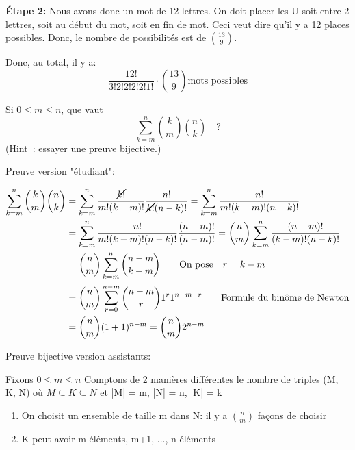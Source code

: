 \textbf{Étape 2: } Nous avons donc un mot de 12 lettres. On doit placer les U soit entre 2 lettres, soit au début du mot, soit en fin de mot. Ceci veut dire qu'il y a 12 places possibles. Donc, le nombre de possibilités est de $ {13 \choose 9} $.

Donc, au total, il y a: \[ \frac{12!}{3! 2! 2! 2! 2! 1!} \cdot {13 \choose 9} \text{mots possibles} \]



\begin{exo} 
Si $0 \leqslant m \leqslant n$, que vaut
\[
\sum_{k=m}^n {k \choose m}{n \choose k}\quad ?
\]
(Hint~: essayer une preuve bijective.)
\end{exo}

Preuve version "étudiant": 

\begin{align*}
 \sum_{k=m}^n {k \choose m}{n \choose k} &= \sum_{k=m}^n \frac{\cancel{k!}}{m!(k-m)!} \frac{n!}{\cancel{k!}(n-k)!} = \sum_{k=m}^n \frac{n!}{m!(k-m)!(n-k)!} \\
 &= \sum_{k=m}^n \frac{n!}{m!(k-m)!(n-k)!} \frac{(n-m)!}{(n-m)!} = {n \choose m} \sum_{k=m}^n \frac{(n-m)!}{(k-m)!(n-k)!} \\
 &= {n \choose m} \sum_{k=m}^n {n-m \choose k-m} \vspace{1cm} \qquad \text{On pose} \quad r=k-m \\
 &= {n \choose m} \sum_{r=0}^{n-m} {n-m \choose r} 1^{r} 1^{n-m-r} \qquad \text{Formule du binôme de Newton} \\
 &= {n \choose m} (1+1)^{n-m} = {n \choose m} 2^{n-m} 
\end{align*}

Preuve bijective version assistants: 

\begin{minipage}{0.4\textwidth}

\end{minipage}
\begin{minipage}{0.6\textwidth}
Fixons $0 \leq m \leq n$
Comptons de 2 manières différentes le nombre de triples (M, K, N) où $M \subseteq K \subseteq N$ et |M| = m, |N| = n, |K| = k

\begin{enumerate}
\item On choisit un ensemble de taille m dans N: il y a ${n \choose m}$ façons de choisir
\item K peut avoir m éléments, m+1, ..., n éléments 
\end{enumerate}
\end{minipage}

